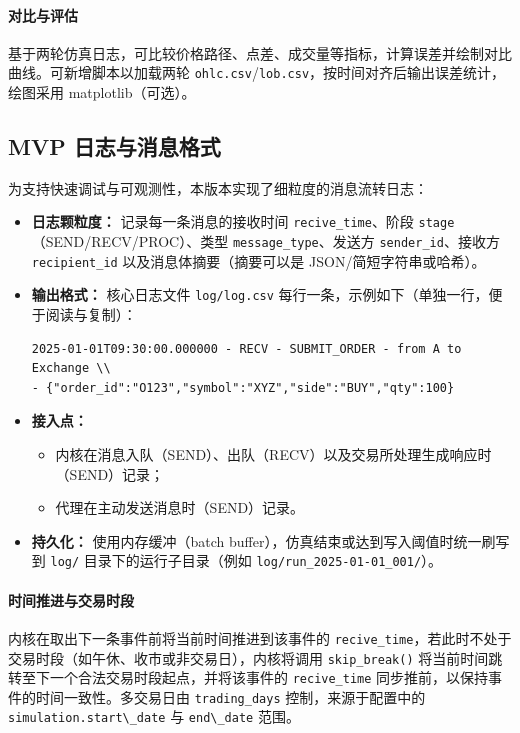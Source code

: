 \paragraph{对比与评估}
基于两轮仿真日志，可比较价格路径、点差、成交量等指标，计算误差并绘制对比曲线。可新增脚本以加载两轮 \verb|ohlc.csv|/\verb|lob.csv|，按时间对齐后输出误差统计，绘图采用 matplotlib（可选）。

\subsection{MVP 日志与消息格式}

为支持快速调试与可观测性，本版本实现了细粒度的消息流转日志：

\begin{itemize}
  \item \textbf{日志颗粒度：}
    记录每一条消息的接收时间 \texttt{recive\_time}、阶段 \texttt{stage}（SEND/RECV/PROC）、类型 \texttt{message\_type}、发送方 \texttt{sender\_id}、接收方 \texttt{recipient\_id} 以及消息体摘要（摘要可以是 JSON/简短字符串或哈希）。
  \item \textbf{输出格式：}
    核心日志文件 \texttt{log/log.csv} 每行一条，示例如下（单独一行，便于阅读与复制）：
\begin{verbatim}
2025-01-01T09:30:00.000000 - RECV - SUBMIT_ORDER - from A to Exchange \\
- {"order_id":"O123","symbol":"XYZ","side":"BUY","qty":100}
\end{verbatim}
  \item \textbf{接入点：}
    \begin{itemize}
      \item 内核在消息入队（SEND）、出队（RECV）以及交易所处理生成响应时（SEND）记录；
      \item 代理在主动发送消息时（SEND）记录。
    \end{itemize}
  \item \textbf{持久化：}
    使用内存缓冲（batch buffer），仿真结束或达到写入阈值时统一刷写到 \texttt{log/} 目录下的运行子目录（例如 \texttt{log/run\_2025-01-01\_001/}）。
\end{itemize}

\paragraph{时间推进与交易时段}
内核在取出下一条事件前将当前时间推进到该事件的 \verb|recive_time|，若此时不处于交易时段（如午休、收市或非交易日），内核将调用 \verb|skip_break()| 将当前时间跳转至下一个合法交易时段起点，并将该事件的 \verb|recive_time| 同步推前，以保持事件的时间一致性。多交易日由 \verb|trading_days| 控制，来源于配置中的 \verb|simulation.start\_date| 与 \verb|end\_date| 范围。


